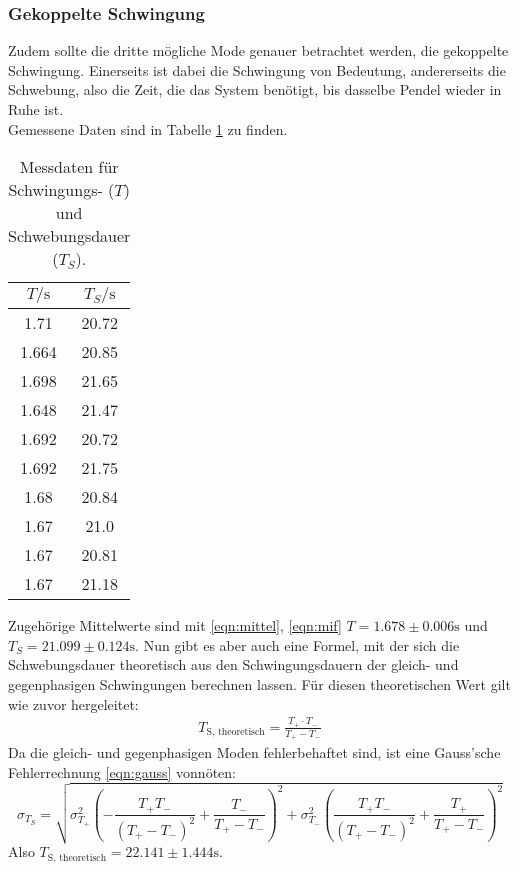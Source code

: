 \subsubsection{Gekoppelte Schwingung}
Zudem sollte die dritte mögliche Mode genauer betrachtet werden, die gekoppelte Schwingung. Einerseits ist dabei die Schwingung von Bedeutung, andererseits die
Schwebung, also die Zeit, die das System benötigt, bis dasselbe Pendel wieder in Ruhe ist. \\
Gemessene Daten sind in Tabelle \ref{tab:gek1} zu finden.
\begin{table}
    \centering
    \caption{Messdaten für Schwingungs- ($T$) und Schwebungsdauer ($T_{S}$).}
    \label{tab:gek1}
    \begin{tabular}{c c}
     \toprule
     $T / \si{\s}$ & $T_{S} / \si{\s}$\\
     \midrule
     1.71 & 20.72 \\
     1.664 & 20.85\\
     1.698 & 21.65\\
     1.648 & 21.47\\
     1.692 & 20.72\\
     1.692 & 21.75\\
     1.68 & 20.84\\
     1.67 & 21.0 \\
     1.67 & 20.81\\
     1.67 & 21.18\\
     \bottomrule
    \end{tabular}
\end{table}
Zugehörige Mittelwerte sind mit \eqref{eqn:mittel}, \eqref{eqn:mif} $T = 1.678 \pm 0.006\si{\s}$ und $T_{S} = 21.099 \pm 0.124\si{\s}$. Nun gibt es aber auch eine Formel, mit der sich die Schwebungsdauer theoretisch aus den Schwingungsdauern der
gleich- und gegenphasigen Schwingungen berechnen lassen. Für diesen theoretischen Wert gilt wie zuvor hergeleitet:
\begin{align}
T_\text{S, theoretisch} = \frac{T_{+} \cdot T_{-}}{T_{+} - T_{-}}
\label{eqn:ts}
\end{align}
Da die gleich- und gegenphasigen Moden fehlerbehaftet sind, ist eine Gauss'sche Fehlerrechnung \eqref{eqn:gauss} vonnöten:
\begin{equation}
\sigma_{T_S} = \sqrt{\sigma_{T_{+}}^{2} \left(- \frac{T_{+} T_{-}}{\left(T_{+} - T_{-}\right)^{2}} + \frac{T_{-}}{T_{+} - T_{-}}\right)^{2} + \sigma_{T_{-}}^{2} \left(\frac{T_{+} T_{-}}{\left(T_{+} - T_{-}\right)^{2}} + \frac{T_{+}}{T_{+} - T_{-}}\right)^{2}}
\end{equation}
Also $T_\text{S, theoretisch}= 22.141 \pm 1.444\si{\s}$.


